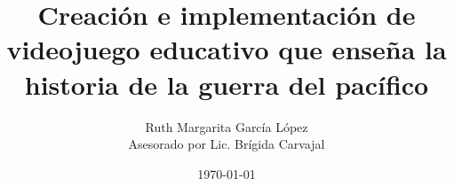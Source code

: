 \documentclass{article}
\begin{document}
\title{Creación e implementación de videojuego educativo que enseña la historia de la guerra del pacífico}
\author{Ruth Margarita García López \\
  Asesorado por Lic. Brígida Carvajal}
\date{\today}
\maketitle

\tableofcontents













\end{document}
